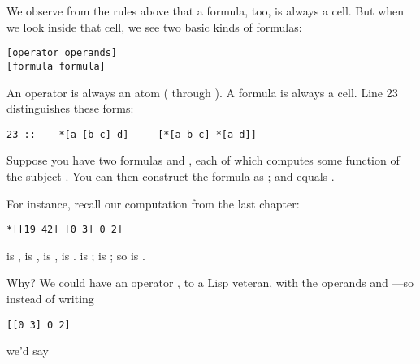 We observe from the rules above that a formula, too, is always a
cell.  But when we look inside that cell, we see two basic kinds
of formulas:

\begin{framed_shaded}
\begin{Verbatim}[fontsize=\relsize{-2.5},fontseries=b,commandchars=\\\{\}]
[operator operands]
[formula formula]
\end{Verbatim}
\end{framed_shaded}
An operator is always an atom ( through ).  A formula is
always a cell.  Line 23 distinguishes these forms:

\begin{framed_shaded}
\begin{Verbatim}[fontsize=\relsize{-2.5},fontseries=b,commandchars=\\\{\}]
23 ::    *[a [b c] d]     [*[a b c] *[a d]]
\end{Verbatim}
\end{framed_shaded}
Suppose you have two formulas  and , each of which computes
some function of the subject .  You can then construct the
formula  as \kode{[f g]}; and  equals \kode{[f(s) g(s)]}.

For instance, recall our computation from the last chapter:

\begin{framed_shaded}
\begin{Verbatim}[fontsize=\relsize{-2.5},fontseries=b,commandchars=\\\{\}]
*[[19 42] [0 3] 0 2]
\end{Verbatim}
\end{framed_shaded}
 is \kode{[19 42]},  is \kode{[0 3]},  is \kode{[0 2]},  is \kode{[[0 3] 0
2]}.   is ;  is ; so  is \kode{[42 19]}.

Why?  We could have an operator ,  to a Lisp veteran,
with the operands  and ---so instead of writing

\begin{framed_shaded}
\begin{Verbatim}[fontsize=\relsize{-2.5},fontseries=b,commandchars=\\\{\}]
[[0 3] 0 2]
\end{Verbatim}
\end{framed_shaded}
we'd say

